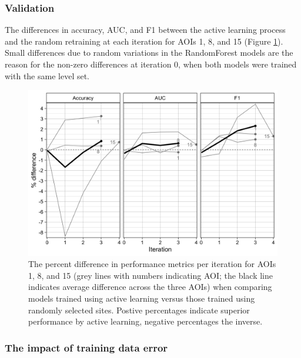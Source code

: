 \documentclass[
  11pt,
  a4paper]{article}
\begin{document}
\hypertarget{validation}{%
\subsubsection{Validation}\label{validation}}

The differences in accuracy, AUC, and F1 between the active learning
process and the random retraining at each iteration for AOIs 1, 8, and
15 (Figure \ref{fig:randomvactive}). Small differences due to random
variations in the RandomForest models are the reason for the non-zero
differences at iteration 0, when both models were trained with the same
level set.\\

\begin{figure}[!ht]

{\centering \includegraphics[width=0.9\linewidth,]{figures/si_random_vs_active} 

}

\caption{The percent difference in performance metrics per iteration for AOIs 1, 8, and 15 (grey lines with numbers indicating AOI; the black line indicates average difference across the three AOIs) when comparing models trained using active learning versus those trained using randomly selected sites. Postive percentages indicate superior performance by active learning, negative percentages the inverse.}\label{fig:randomvactive}
\end{figure}

\hypertarget{the-impact-of-training-data-error}{%
\subsubsection{The impact of training data
error}\label{the-impact-of-training-data-error}}
\end{document}
